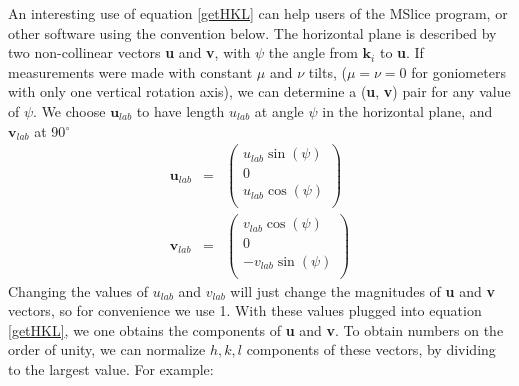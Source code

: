 \documentclass[prb]{revtex4}%
\begin{document}
An interesting use of equation \ref{getHKL} can help users of the MSlice program, or other software using the convention below.
The horizontal plane is described by two non-collinear vectors \textbf{u} and \textbf{v}, with $\psi$ the angle from
$\textbf{k}_i$ to \textbf{u}. If measurements were made with constant $\mu$ and $\nu$ tilts, ($\mu = \nu = 0$
for goniometers with only one vertical rotation axis), we can determine a (\textbf{u}, \textbf{v}) pair for any value of $\psi$.
We choose $\textbf{u}_{lab}$ to have length $u_{lab}$ at angle $\psi$ in the horizontal plane, and $\textbf{v}_{lab}$ at 90$^\circ$
\begin{eqnarray}
  \textbf{u}_{lab} &=& \left(
                     \begin{array}{c}
                       u_{lab} \sin(\psi) \\
                       0 \\
                       u_{lab} \cos(\psi) \\
                     \end{array}
                   \right)
   \\
  \textbf{v}_{lab} &=& \left(
                     \begin{array}{c}
                       v_{lab} \cos(\psi) \\
                       0 \\
                       -v_{lab} \sin(\psi) \\
                     \end{array}
                   \right)
\end{eqnarray}
Changing the values of $u_{lab}$ and $v_{lab}$ will just change the magnitudes of \textbf{u} and \textbf{v} vectors,
so for convenience we use 1. With these values plugged
into equation \ref{getHKL}, we one obtains the components of \textbf{u} and \textbf{v}. To obtain numbers on the order of unity,
we can normalize $h, k, l$ components of these vectors, by dividing to the largest value. For example:
\end{document}
